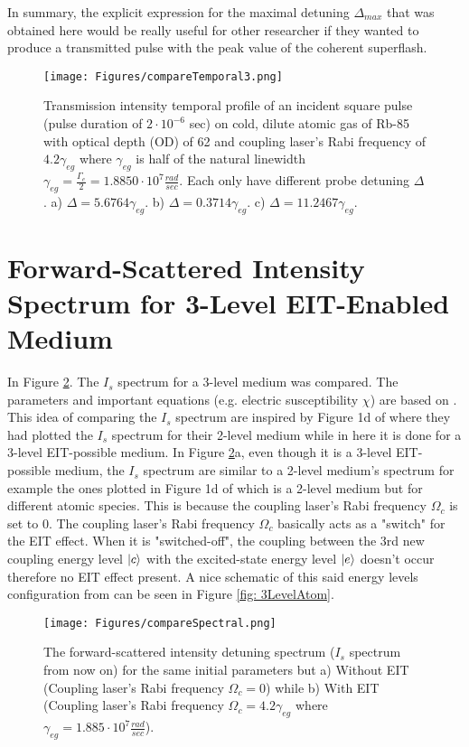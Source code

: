 In summary, the explicit expression for the maximal detuning $\Delta_{max}$ that was obtained here would be really useful for other researcher if they wanted to produce a transmitted pulse with the peak value of the coherent superflash.

\begin{figure}[h!]
    \centering
    \texttt{[image: Figures/compareTemporal3.png]}
    \caption{Transmission intensity temporal profile of an incident square pulse (pulse duration of $2\cdot10^{-6}$ sec) on cold, dilute atomic gas of Rb-85 with optical depth (OD) of 62 and coupling laser's Rabi frequency of $4.2\gamma_{eg}$ where $\gamma_{eg}$ is half of the natural linewidth $\gamma_{eg} = \frac{\Gamma_{e}}{2} = 1.8850 \cdot 10^{7} \frac{rad}{sec}$. Each only have different probe detuning $\Delta$. a) $\Delta = 5.6764\gamma_{eg}$. b) $\Delta = 0.3714\gamma_{eg}$. c) $\Delta = 11.2467\gamma_{eg}$.}
    \label{fig: comparing temporal profile}
\end{figure}


\section{Forward-Scattered Intensity Spectrum for 3-Level EIT-Enabled Medium}
In Figure \ref{fig: comparing Is spectrum}. The $I_{s}$ spectrum for a 3-level medium was compared. The parameters and important equations (e.g. electric susceptibility $\chi$) are based on \cite{jeong2010slow}. This idea of comparing the $I_{s}$ spectrum are inspired by Figure 1d of \cite{Kwong2014} where they had plotted the $I_{s}$ spectrum for their 2-level medium while in here it is done for a 3-level EIT-possible medium. In Figure \ref{fig: comparing Is spectrum}a, even though it is a 3-level EIT-possible medium, the $I_{s}$ spectrum are similar to a 2-level medium's spectrum for example the ones plotted in Figure 1d of \cite{Kwong2014} which is a 2-level medium but for different atomic species. This is because the coupling laser's Rabi frequency $\Omega_{c}$ is set to $0$. The coupling laser's Rabi frequency $\Omega_{c}$ basically acts as a "switch" for the EIT effect. When it is "switched-off", the coupling between the 3rd new coupling energy level $\ket{c}$ with the excited-state energy level $\ket{e}$ doesn't occur therefore no EIT effect present. A nice schematic of this said energy levels configuration from \cite{Jeong2009} can be seen in Figure \ref{fig: 3LevelAtom}.

\begin{figure}[h!]
    \centering
    \texttt{[image: Figures/compareSpectral.png]}
    \caption{The forward-scattered intensity detuning spectrum ($I_{s}$ spectrum from now on) for the same initial parameters but a) Without EIT (Coupling laser's Rabi frequency $\Omega_{c} = 0$) while b) With EIT (Coupling laser's Rabi frequency $\Omega_{c} = 4.2\gamma_{eg}$ where $\gamma_{eg} = 1.885 \cdot 10^{7} \frac{rad}{sec}$).}
    \label{fig: comparing Is spectrum}
\end{figure}

